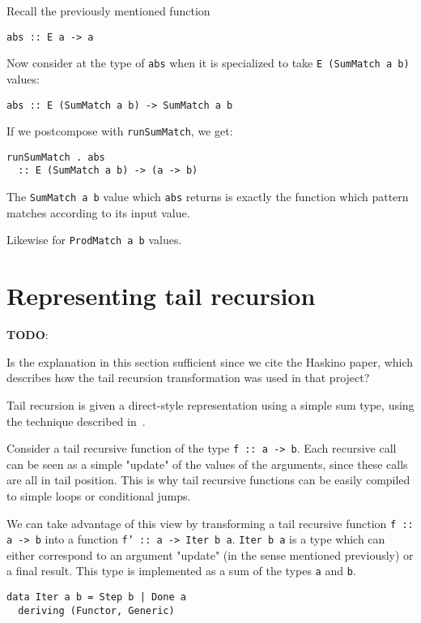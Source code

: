 \documentclass[sigplan,anonymous,review]{acmart}
\newcommand{\ttt}{\texttt}
\newenvironment{todo}
  {\begin{tcolorbox}
   \textbf{TODO}:
  }
  {\end{tcolorbox}
  }
\begin{document}
Recall the previously mentioned function

\begin{lstlisting}
abs :: E a -> a
\end{lstlisting}

Now consider at the type of \ttt{abs} when it is specialized to take
\ttt{E (SumMatch a b)} values:

\begin{lstlisting}
abs :: E (SumMatch a b) -> SumMatch a b
\end{lstlisting}

If we postcompose with \ttt{runSumMatch}, we get:

\begin{lstlisting}
runSumMatch . abs
  :: E (SumMatch a b) -> (a -> b)
\end{lstlisting}

The \ttt{SumMatch a b} value which \ttt{abs} returns is exactly the function
which pattern matches according to its input value.

Likewise for \ttt{ProdMatch a b} values.

\section{Representing tail recursion}
\begin{todo}
  Is the explanation in this section sufficient since we cite the Haskino paper,
  which describes how the tail recursion transformation was used in that project?
\end{todo}

Tail recursion is given a direct-style representation using a simple sum type,
using the technique described in~\cite{Grebe:2017:RSD:3136040.3136048}.

Consider a tail recursive function of the type \ttt{f :: a -> b}. Each recursive
call can be seen as a simple "update" of the values of the arguments, since
these calls are all in tail position. This is why tail recursive functions
can be easily compiled to simple loops or conditional jumps.

We can take advantage of this view by transforming a tail recursive function
\ttt{f :: a -> b} into a function \ttt{f' :: a -> Iter b a}. \ttt{Iter b a} is a
type which can either correspond to an argument "update" (in the sense mentioned
previously) or a final result. This type is implemented as a sum of the types
\ttt{a} and \ttt{b}.

\begin{lstlisting}
data Iter a b = Step b | Done a
  deriving (Functor, Generic)
\end{lstlisting}
\end{document}
